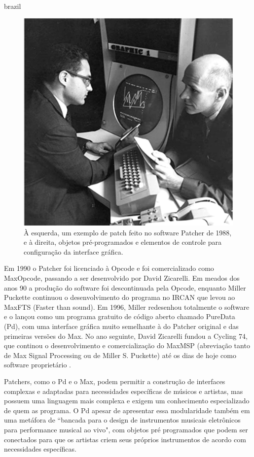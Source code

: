 \begin{otherlanguage*}{brazil}
\begin{figure}[ht]
    \caption{\label{patcher}À esquerda, um exemplo de patch feito no software Patcher de 1988, e à direita, objetos pré-programados e elementos de controle para configuração da interface gráfica.}
    \begin{center}
        \includegraphics[width=0.5\linewidth]{pictures/MaxHolmes-251}
    \end{center}
\end{figure}


Em 1990 o Patcher foi licenciado à Opcode e foi comercializado como Max\/Opcode, passando a ser desenvolvido por David Zicarelli. Em meados dos anos 90 a produção do software foi descontinuada pela Opcode, enquanto Miller Puckette continuou o desenvolvimento do programa no IRCAN que levou ao Max\/FTS (Faster than sound). Em 1996, Miller redesenhou totalmente o software e o lançou como um programa gratuito de código aberto chamado PureData (Pd), com uma interface gráfica muito semelhante à do Patcher original e das primeiras versões do Max. No ano seguinte, David Zicarelli fundou a Cycling 74, que continou o desenvolvimento e comercialização do Max\/MSP (abreviação tanto de Max Signal Processing ou de Miller S. Puckette) até os dias de hoje como software proprietário \cite{Cryer2018}.


Patchers, como o Pd e o Max, podem permitir a construção de interfaces complexas e adaptadas para necessidades específicas de músicos e artistas, mas possuem uma linguagem mais complexa e exigem um conhecimento especializado de quem as programa. O Pd apesar de apresentar essa modularidade também em uma metáfora de ``bancada para o design de instrumentos musicais eletrônicos para performance musical ao vivo", com objetos pré programados que podem ser conectados para que os artistas criem seus próprios instrumentos de acordo com necessidades específicas. \cite{PucketteMiller}
 

\end{otherlanguage*}

